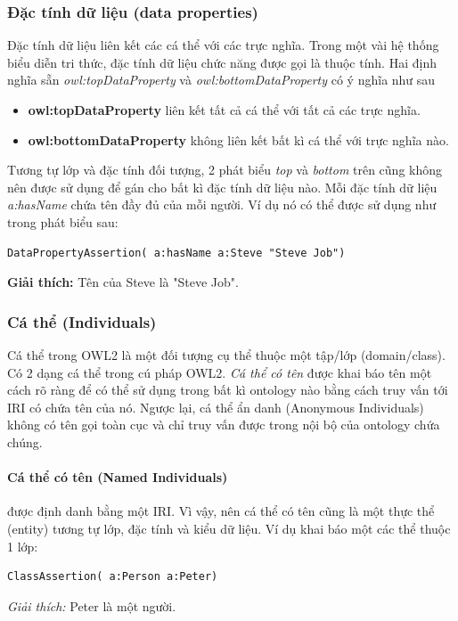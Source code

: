 \subsubsection{Đặc tính dữ liệu (data properties)}
Đặc tính dữ liệu liên kết các cá thể với các trực nghĩa. Trong một vài hệ thống biểu diễn tri thức, đặc tính dữ liệu chức năng được gọi là thuộc tính.
Hai định nghĩa sẵn \textit{owl:topDataProperty} và \textit{owl:bottomDataProperty} có ý nghĩa như sau
\begin{itemize}
\item \textbf{owl:topDataProperty} liên kết tất cả cá thể với tất cả các trực nghĩa.
\item \textbf{owl:bottomDataProperty} không liên kết bất kì cá thể với trực nghĩa nào.
\end{itemize}
Tương tự lớp và đặc tính đối tượng, 2 phát biểu \textit{top} và \textit{bottom} trên cũng không nên được sử dụng để gán cho bất kì đặc tính dữ liệu nào. Mỗi đặc tính dữ liệu \textit{a:hasName} chứa tên đầy đủ của mỗi người. Ví dụ nó có thể được sử dụng như trong phát biểu sau:
\begin{verbatim}
DataPropertyAssertion( a:hasName a:Steve "Steve Job") 
\end{verbatim}
\textbf{Giải thích:} Tên của Steve là "Steve Job".

\subsubsection{Cá thể (Individuals)}
Cá thể trong OWL2 là một đối tượng cụ thể thuộc một tập/lớp (domain/class). Có 2 dạng cá thể trong cú pháp OWL2. \textit{Cá thể có tên} được khai báo tên một cách rõ ràng để có thể sử dụng trong bất kì ontology nào bằng cách truy vấn tới IRI có chứa tên của nó. Ngược lại, cá thể ẩn danh (Anonymous Individuals) không có tên gọi toàn cục và chỉ truy vấn được trong nội bộ của ontology chứa chúng.

\paragraph{Cá thể có tên (Named Individuals)} được định danh bằng một IRI. Vì vậy, nên cá thể có tên cũng là một thực thể (entity) tương tự lớp, đặc tính và kiểu dữ liệu. Ví dụ khai báo một các thể thuộc 1 lớp:
\begin{verbatim}
ClassAssertion( a:Person a:Peter)
\end{verbatim}
\textit{Giải thích:} Peter là một người.

